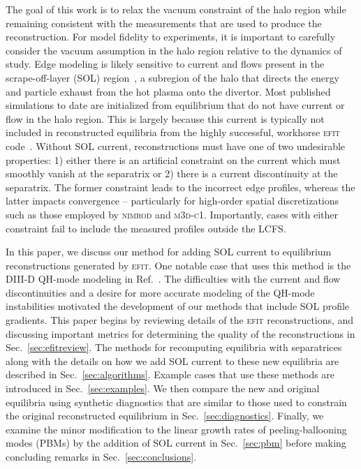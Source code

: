 \documentclass[english,aps,superscriptaddress,showkeys,showpacs,prepri,twocolumn]{revtex4}
\begin{document}
The goal of this work is to relax the vacuum constraint of the halo region
while remaining consistent with the measurements that are used to produce the
reconstruction.  
For model fidelity to experiments, it is important to carefully consider
the vacuum assumption in the halo region relative to the dynamics of study.
Edge modeling is likely sensitive to current and flows present in the
scrape-off-layer (SOL) region~\cite{Groth:2007ik}, a subregion of the halo that
directs the energy and particle exhaust from the hot plasma onto the divertor.
Most published simulations to date are initialized from
equilibrium that do not have current or flow in the halo region.  This is largely
because this current is typically not included in reconstructed equilibria
from the highly successful, workhorse \textsc{efit}
code~\cite{Lao:1985ww,Lao:1985wa}.  Without SOL current, reconstructions must
have one of two undesirable properties: 1) either there is an artificial
constraint on the current which must smoothly vanish at the separatrix or 2)
there is a current discontinuity at the separatrix.  The former constraint
leads to the incorrect edge profiles, whereas the latter impacts convergence --
particularly for high-order spatial discretizations such as those employed by
\textsc{nimrod} and \textsc{m3d-c1}.  Importantly, cases with either constraint
fail to include the measured profiles outside the LCFS.

In this paper, we
discuss our method for adding SOL current to equilibrium
reconstructions generated by \textsc{efit}. 
One notable case that uses this method is the DIII-D QH-mode modeling in
Ref.~\cite{King16qh}.  The difficulties with the current and flow discontinuities and a
desire for more accurate modeling of the QH-mode instabilities motivated the
development of our methods that include SOL profile gradients.
This paper begins by reviewing details of
the \textsc{efit} reconstructions, and discussing important metrics for
determining the quality of the reconstructions in Sec.~\ref{sec:efitreview}.
The methods for recomputing equilibria with separatrices along with the
details on how we add SOL current to these new equilibria  are described in
Sec.~\ref{sec:algorithms}. Example cases that use these methods are introduced
in Sec.~\ref{sec:examples}. We then compare the new and original equilibria
using synthetic diagnostics that are similar to those used to constrain the
original reconstructed equilibrium in Sec.~\ref{sec:diagnostics}.  Finally, we
examine the minor modification to the linear growth rates of peeling-ballooning
modes (PBMs) by the addition of SOL current in Sec.~\ref{sec:pbm} before
making concluding remarks in Sec.~\ref{sec:conclusions}.
\end{document}
